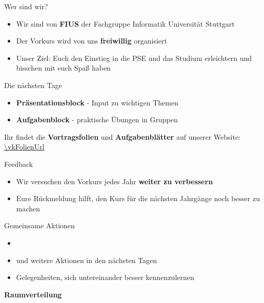 \documentclass{../../presentation}
\title{\vkTitle}
\author{\vkAuthors}
\institute{\vkInstitute}
\date{\vkDateDayZero}
\begin{document}
\begin{frame}
	\titlepage
\end{frame}

\begin{frame}{Wer sind wir?}
	\begin{itemize}
		\item Wir sind von \textbf{FIUS} der Fachgruppe Informatik Universität Stuttgart
		\item Der Vorkurs wird von uns \textbf{freiwillig} organisiert
		\item Unser Ziel: Euch den Einstieg in die PSE und das Studium erleichtern und bisschen mit euch Spaß haben
	\end{itemize}
\end{frame}

\begin{frame}{Die nächsten Tage}
	\begin{itemize}
		\item \textbf{Präsentationsblock} - Input zu wichtigen Themen
		\item \textbf{Aufgabenblock} - praktische Übungen in Gruppen
	\end{itemize}
	\achtung{} Ihr findet die \textbf{Vortragsfolien} und \textbf{Aufgabenblätter} auf unserer Website:
	\url{\vkFolienUrl}
\end{frame}

\begin{frame}{Feedback}
	\begin{itemize}
		\item Wir versuchen den Vorkurs jedes Jahr \textbf{weiter zu verbessern}
		\item Eure Rückmeldung hilft, den Kurs für die nächsten Jahrgänge noch besser zu machen
	\end{itemize}
\end{frame}

\begin{frame}{Gemeinsame Aktionen}
	\begin{itemize}
		\item \vkEventDayZero
		\item und weitere Aktionen in den nächsten Tagen
		\item Gelegenheiten, sich untereinander besser kennenzulernen
	\end{itemize}
\end{frame}

\begin{frame}[plain]
	\centering
	{\Huge\bfseries{Raumverteilung}}
\end{frame}
\end{document}
